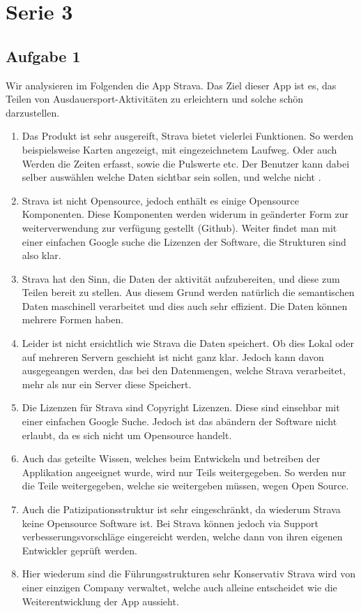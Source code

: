 \documentclass[10pt]{article}
\newcommand{\heading}[2]{\setcounter{section}{#2}\section*{#1 #2}}
\newcommand{\problem}[1]{\subsection{#1}}
\begin{document}
    \heading{Serie}{3}
    \problem{Aufgabe 1}
    Wir analysieren im Folgenden die App Strava. Das Ziel dieser App ist es, das Teilen von Ausdauersport-Aktivitäten zu erleichtern und solche schön darzustellen. 
    
    \begin{enumerate}
    	\item Das Produkt ist sehr ausgereift, Strava bietet vielerlei Funktionen. So werden beispielsweise Karten angezeigt, mit eingezeichnetem Laufweg. Oder auch Werden die Zeiten erfasst, sowie die Pulswerte etc. Der Benutzer kann dabei selber auswählen welche Daten sichtbar sein sollen, und welche nicht .
    	\item Strava ist nicht Opensource, jedoch enthält es einige Opensource Komponenten. Diese Komponenten werden widerum in geänderter Form zur weiterverwendung zur verfügung gestellt (Github). Weiter findet man mit einer einfachen Google suche die Lizenzen der Software, die Strukturen sind also klar. 
    	\item Strava hat den Sinn, die Daten der aktivität aufzubereiten, und diese zum Teilen bereit zu stellen. Aus diesem Grund werden natürlich die semantischen Daten maschinell verarbeitet und dies auch sehr effizient. Die Daten können mehrere Formen haben. 
    	\item Leider ist nicht ersichtlich wie Strava die Daten speichert. Ob dies Lokal oder auf mehreren Servern geschieht ist nicht ganz klar. Jedoch kann davon ausgegeangen werden, das bei den Datenmengen, welche Strava verarbeitet, mehr als nur ein Server diese Speichert. 
    	\item Die Lizenzen für Strava sind Copyright Lizenzen. Diese sind einsehbar mit einer einfachen Google Suche. Jedoch ist das abändern der Software nicht erlaubt, da es sich nicht um Opensource handelt.
    	\item Auch das geteilte Wissen, welches beim Entwickeln und betreiben der Applikation angeeignet wurde, wird nur Teils weitergegeben. So werden nur die Teile weitergegeben, welche sie weitergeben müssen, wegen Open Source.
    	\item Auch die Patizipationsstruktur ist sehr eingeschränkt, da wiederum Strava keine Opensource Software ist. Bei Strava können jedoch via Support verbesserungsvorschläge eingereicht werden, welche dann von ihren eigenen Entwickler geprüft werden.
    	\item Hier wiederum sind die Führungsstrukturen sehr Konservativ Strava wird von einer einzigen Company verwaltet, welche auch alleine entscheidet wie die Weiterentwicklung der App aussieht.

\end{enumerate}
\end{document}

